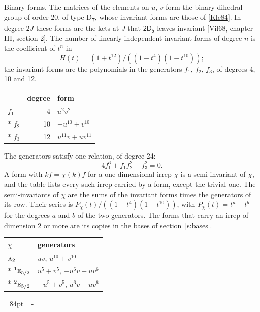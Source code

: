 \documentclass[10pt,a4paper]{article}
\makeatletter
\renewcommand\paragraph{\@startsection{paragraph}{4}{\z@}{1.5ex plus .5ex minus .2ex}{-1em}%
  {\normalfont\small\sffamily\bfseries\color{parttitle}}}
\newcommand{\needspace}[1]{\par\penalty-100\begingroup\dimen0=#1\relax\dimen2=\pagegoal
  \advance\dimen2-\pagetotal\ifdim\dimen0>\dimen2\relax\ifdim\dimen2>0pt\vfil\break\fi\fi
  \endgroup}
\numberwithin{equation}{section}
\newcommand{\grp}[1]{\mathsf{#1}}
\newcommand{\irr}[1]{\text{\normalfont\scshape #1}}
\newcommand{\conjpair}[1]{{}^{#1}}
\makeatother
\begin{document}
\paragraph{Binary forms.}
The matrices of the elements on $u$, $v$ form the binary dihedral group of order 20, of type D\textsubscript{7}, whose invariant forms are those of [\href{../../../REFERENCES.pdf\#ref.Kle84}{Kle84}]. In degree $2J$ these forms are the kets at $J$ that $\grp{2D_{5}}$ leaves invariant [\href{../../../REFERENCES.pdf\#ref.Vil68}{Vil68}, chapter III, section 2]. \label{n:head.degree}\label{n:head.form}The number of linearly independent invariant forms of degree $n$ is the coefficient of $t^n$ in
\begin{equation}\label{e:molien}H(t) = (1 + t^{12})/((1-t^{4})(1-t^{10}));\end{equation}
the invariant forms are the polynomials in the generators $f_1$, $f_2$, $f_3$, of degrees 4, 10 and 12.
{\small\begin{longtable}{@{}lrl@{}}\toprule
& degree & form\\\midrule\endhead
\bottomrule\endfoot\endlastfoot
$f_{1}$ & 4 & $u^{2}v^{2}$\\*
$f_{2}$ & 10 & $-u^{10} + v^{10}$\\*
$f_{3}$ & 12 & $u^{11}v + uv^{11}$\\
\bottomrule\end{longtable}}
The generators satisfy one relation, of degree 24:
\begin{equation}\label{e:relation}4f_{1}^{6} + f_{1}f_{2}^{2} - f_{3}^{2} = 0.\end{equation}
A form with $k f = \chi(k) f$ for a one-dimensional irrep $\chi$ is a semi-invariant of $\chi$, and the table lists every such irrep carried by a form, except the trivial one. \label{n:head.generators}The semi-invariants of $\chi$ are the sums of the invariant forms times the generators of its row. Their series is $P_\chi(t)/((1-t^{4})(1-t^{10}))$, with $P_\chi(t) = t^{a} + t^{b}$ for the degrees $a$ and $b$ of the two generators. The forms that carry an irrep of dimension 2 or more are its copies in the bases of section~\ref{s:bases}.
{\small\begin{longtable}{@{}ll@{}}\toprule
$\chi$ & generators\\\midrule\endhead
\bottomrule\endfoot\endlastfoot
$\irr{a}_{2}$ & $uv$, $u^{10} + v^{10}$\\*
$\conjpair{1}\irr{e}_{5/2}$ & $u^{5} + v^{5}$, $-u^{6}v + uv^{6}$\\*
$\conjpair{2}\irr{e}_{5/2}$ & $-u^{5} + v^{5}$, $u^{6}v + uv^{6}$\\
\bottomrule\end{longtable}}
\needspace{84pt}
\end{document}
